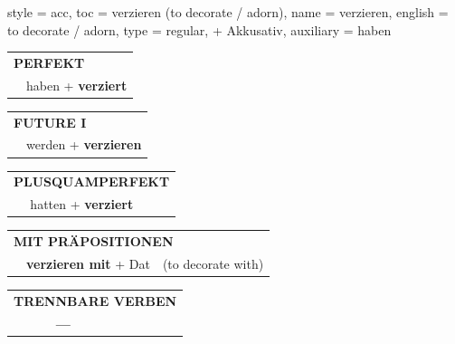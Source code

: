 \begin{verbentry}{
  style = {acc},
  toc = {verzieren (to decorate / adorn)},
  name = {verzieren},
  english = {to decorate / adorn},
  type = {regular, + Akkusativ},
  auxiliary = {haben}
}
\vspace{10pt}

\begin{tabular}{rl}
\multicolumn{2}{l}{\textbf{PERFEKT}}\\
& haben + \textbf{verziert}\\
\end{tabular}
\hfill
\begin{tabular}{rl}
\multicolumn{2}{l}{\textbf{FUTURE I}}\\
& werden + \textbf{verzieren}\\
\end{tabular}
\hfill
\begin{tabular}{rl}
\multicolumn{2}{l}{\textbf{PLUSQUAMPERFEKT}}\\
& hatten + \textbf{verziert}\\
\end{tabular}

\vspace{10pt}

\begin{tabular}{lll}
\multicolumn{3}{l}{\textbf{MIT PRÄPOSITIONEN}}\\
& \textbf{verzieren mit} + Dat & (to decorate with)\\
\end{tabular}
\hfill
\begin{tabular}{lll}
\multicolumn{3}{l}{\textbf{TRENNBARE VERBEN}}\\
& \textbf{---} & \\
\end{tabular}

\vspace{-5pt}
\end{verbentry}
